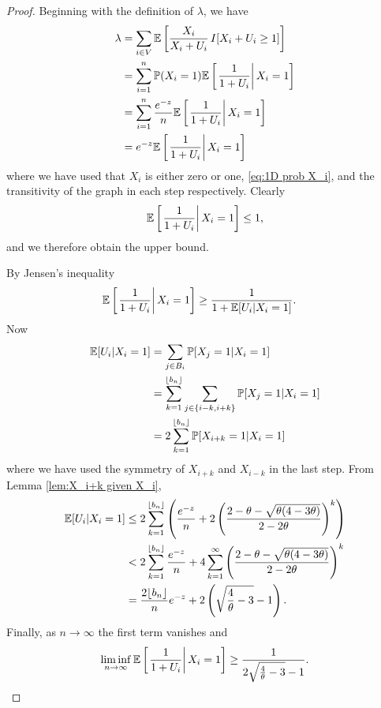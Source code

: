	\begin{proof}
	Beginning with the definition of $\lambda$, we have
		\begin{align}
			\lambda &= \sum_{i \in V} \mathbb{E}\left[\frac{X_i}{X_i + U_i} \, I[ X_i + U_i \geq 1] \right]\\
				&= \sum_{i = 1}^n \mathbb{P}(X_i = 1) \mathbb{E} \left[\left.\frac{1}{1 + U_i}\right| X_i = 1\right]\\
				&= \sum_{i = 1}^n \frac{e^{-z}}{n} \mathbb{E} \left[\left.\frac{1}{1 + U_i}\right| X_i = 1\right]\\
				&= e^{-z} \mathbb{E} \left[\left.\frac{1}{1 + U_i}\right| X_i = 1\right]
		\end{align}
		where we have used that $X_i$ is either zero or one, \eqref{eq:1D prob X_i}, and the transitivity of the graph in each step respectively.
		Clearly 
		\begin{align}
			\mathbb{E} \left[\left.\frac{1}{1 + U_i}\right| X_i = 1\right] \leq 1,
		\end{align}
		and we therefore obtain the upper bound.

		By Jensen's inequality
		\begin{align}
			\expect \left[\left.\frac{1}{1 + U_i}\right| X_i = 1\right] &\geq %
				\frac{1}{1 + \expect[U_i | X_i = 1]}.
		\end{align}
		Now
		\begin{align}
			\mathbb{E}[U_i | X_i = 1] &= \sum_{j \in B_i} \mathbb{P}[X_j = 1| X_i = 1]\\
				&= \sum_{k=1}^{\lfloor b_n\rfloor} \sum_{j \in \{i-k,i+k\}} \mathbb{P}[X_j = 1| X_i = 1]\\
				&= 2 \sum_{k=1}^{\lfloor b_n\rfloor} \mathbb{P}[X_{i+k} = 1 | X_i = 1]
		\end{align}
		where we have used the symmetry of $X_{i+k}$ and $X_{i -k}$ in the last step. From Lemma \ref{lem:X_i+k given X_i}, 
		\begin{align}
			\mathbb{E}[U_i | X_i = 1] &\leq 2 \sum_{k = 1}^{\lfloor b_n\rfloor} \left(\frac{e^{-z}}{n} + 2 \left(\frac{2 - \theta - \sqrt{\theta(4 - 3\theta)}}{2 - 2\theta}\right)^k\right)\\
				&< 2 \sum_{k = 1}^{\lfloor b_n\rfloor} \frac{e^{-z}}{n} + 4\sum_{k = 1}^\infty \left(\frac{2 - \theta - \sqrt{\theta(4 - 3\theta)}}{2 - 2\theta}\right)^k\\
				&= \frac{2 \lfloor b_n\rfloor}{n}e^{-z} + 2\left(\sqrt{\frac{4}{\theta} - 3} - 1\right).
		\end{align}
		Finally, as $n \rightarrow \infty$ the first term vanishes and
		\begin{align}
			\liminf_{n \rightarrow \infty} \mathbb{E} \left[\left.\frac{1}{1 + U_i}\right| X_i = 1\right] \geq \frac{1}{2\sqrt{\frac{4}{\theta} - 3} - 1}.
		\end{align}
	\end{proof}

